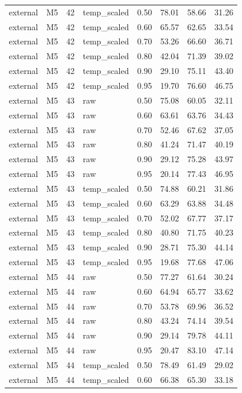 \begin{tabular}{llrlrrrr}
external & M5 & 42 & temp\_scaled & 0.50 & 78.01 & 58.66 & 31.26 \\
external & M5 & 42 & temp\_scaled & 0.60 & 65.57 & 62.65 & 33.54 \\
external & M5 & 42 & temp\_scaled & 0.70 & 53.26 & 66.60 & 36.71 \\
external & M5 & 42 & temp\_scaled & 0.80 & 42.04 & 71.39 & 39.02 \\
external & M5 & 42 & temp\_scaled & 0.90 & 29.10 & 75.11 & 43.40 \\
external & M5 & 42 & temp\_scaled & 0.95 & 19.70 & 76.60 & 46.75 \\
external & M5 & 43 & raw & 0.50 & 75.08 & 60.05 & 32.11 \\
external & M5 & 43 & raw & 0.60 & 63.61 & 63.76 & 34.43 \\
external & M5 & 43 & raw & 0.70 & 52.46 & 67.62 & 37.05 \\
external & M5 & 43 & raw & 0.80 & 41.24 & 71.47 & 40.19 \\
external & M5 & 43 & raw & 0.90 & 29.12 & 75.28 & 43.97 \\
external & M5 & 43 & raw & 0.95 & 20.14 & 77.43 & 46.95 \\
external & M5 & 43 & temp\_scaled & 0.50 & 74.88 & 60.21 & 31.86 \\
external & M5 & 43 & temp\_scaled & 0.60 & 63.29 & 63.88 & 34.48 \\
external & M5 & 43 & temp\_scaled & 0.70 & 52.02 & 67.77 & 37.17 \\
external & M5 & 43 & temp\_scaled & 0.80 & 40.80 & 71.75 & 40.23 \\
external & M5 & 43 & temp\_scaled & 0.90 & 28.71 & 75.30 & 44.14 \\
external & M5 & 43 & temp\_scaled & 0.95 & 19.68 & 77.68 & 47.06 \\
external & M5 & 44 & raw & 0.50 & 77.27 & 61.64 & 30.24 \\
external & M5 & 44 & raw & 0.60 & 64.94 & 65.77 & 33.62 \\
external & M5 & 44 & raw & 0.70 & 53.78 & 69.96 & 36.52 \\
external & M5 & 44 & raw & 0.80 & 43.24 & 74.14 & 39.54 \\
external & M5 & 44 & raw & 0.90 & 29.14 & 79.78 & 44.11 \\
external & M5 & 44 & raw & 0.95 & 20.47 & 83.10 & 47.14 \\
external & M5 & 44 & temp\_scaled & 0.50 & 78.49 & 61.49 & 29.02 \\
external & M5 & 44 & temp\_scaled & 0.60 & 66.38 & 65.30 & 33.18 \\

\end{tabular}
